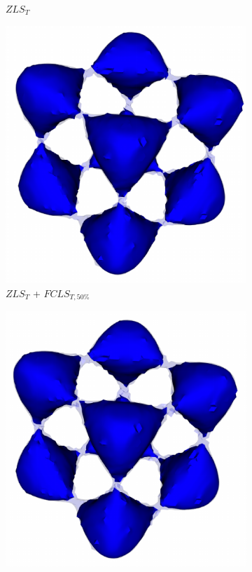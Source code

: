 \begin{figure}[!ht]
\begin{subfigure}{0.195\linewidth}
\vspace{-2mm}
\caption{$ZLS_{T}$}
\label{fig:tangle_zls}
\end{subfigure}
\begin{subfigure}{0.195\linewidth}
\centering
\includegraphics[width=0.85\linewidth]{Images/Tangle/fcls_50.pdf}
\vspace{-2mm}
\caption{$ZLS_{T}$ + $FCLS_{T,50\%}$}
\label{fig:tangle_fcls_50}
\end{subfigure}
\begin{subfigure}{0.195\linewidth}
\centering
\includegraphics[width=0.85\linewidth]{Images/Tangle/fcls_68.pdf}

\end{subfigure}
\end{figure}
